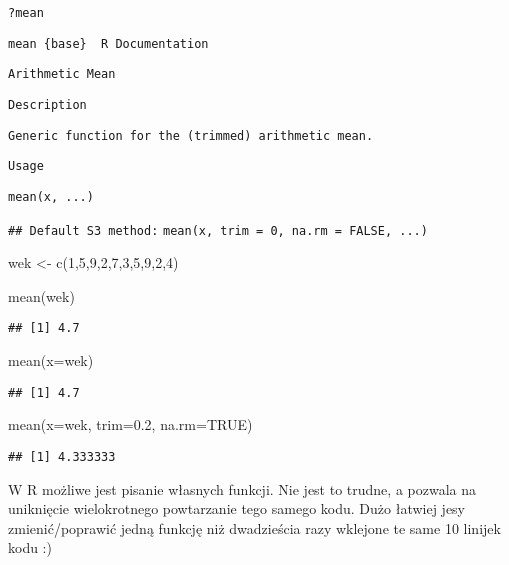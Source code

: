 \documentclass[
]{book}
\newenvironment{Shaded}{\begin{snugshade}}{\end{snugshade}}
\newcommand{\AttributeTok}[1]{\textcolor[rgb]{0.77,0.63,0.00}{#1}}
\newcommand{\ConstantTok}[1]{\textcolor[rgb]{0.00,0.00,0.00}{#1}}
\newcommand{\DecValTok}[1]{\textcolor[rgb]{0.00,0.00,0.81}{#1}}
\newcommand{\FloatTok}[1]{\textcolor[rgb]{0.00,0.00,0.81}{#1}}
\newcommand{\FunctionTok}[1]{\textcolor[rgb]{0.00,0.00,0.00}{#1}}
\newcommand{\NormalTok}[1]{#1}
\newcommand{\OtherTok}[1]{\textcolor[rgb]{0.56,0.35,0.01}{#1}}
\begin{document}
\texttt{?mean}

\texttt{mean\ \{base\}\ \ R\ Documentation}

\texttt{Arithmetic\ Mean}

\texttt{Description}

\texttt{Generic\ function\ for\ the\ (trimmed)\ arithmetic\ mean.}

\texttt{Usage}

\texttt{mean(x,\ ...)}

\texttt{\#\#\ Default\ S3\ method:}
\texttt{mean(x,\ trim\ =\ 0,\ na.rm\ =\ FALSE,\ ...)}

\begin{Shaded}
\begin{Highlighting}[]
\NormalTok{wek }\OtherTok{\textless{}{-}} \FunctionTok{c}\NormalTok{(}\DecValTok{1}\NormalTok{,}\DecValTok{5}\NormalTok{,}\DecValTok{9}\NormalTok{,}\DecValTok{2}\NormalTok{,}\DecValTok{7}\NormalTok{,}\DecValTok{3}\NormalTok{,}\DecValTok{5}\NormalTok{,}\DecValTok{9}\NormalTok{,}\DecValTok{2}\NormalTok{,}\DecValTok{4}\NormalTok{)}

\FunctionTok{mean}\NormalTok{(wek)}
\end{Highlighting}
\end{Shaded}

\begin{verbatim}
## [1] 4.7
\end{verbatim}

\begin{Shaded}
\begin{Highlighting}[]
\FunctionTok{mean}\NormalTok{(}\AttributeTok{x=}\NormalTok{wek)}
\end{Highlighting}
\end{Shaded}

\begin{verbatim}
## [1] 4.7
\end{verbatim}

\begin{Shaded}
\begin{Highlighting}[]
\FunctionTok{mean}\NormalTok{(}\AttributeTok{x=}\NormalTok{wek, }\AttributeTok{trim=}\FloatTok{0.2}\NormalTok{, }\AttributeTok{na.rm=}\ConstantTok{TRUE}\NormalTok{)}
\end{Highlighting}
\end{Shaded}

\begin{verbatim}
## [1] 4.333333
\end{verbatim}

W R możliwe jest pisanie własnych funkcji. Nie jest to trudne, a pozwala na uniknięcie wielokrotnego powtarzanie tego samego kodu. Dużo łatwiej jesy zmienić/poprawić jedną funkcję niż dwadzieścia razy wklejone te same 10 linijek kodu :)
\end{document}
